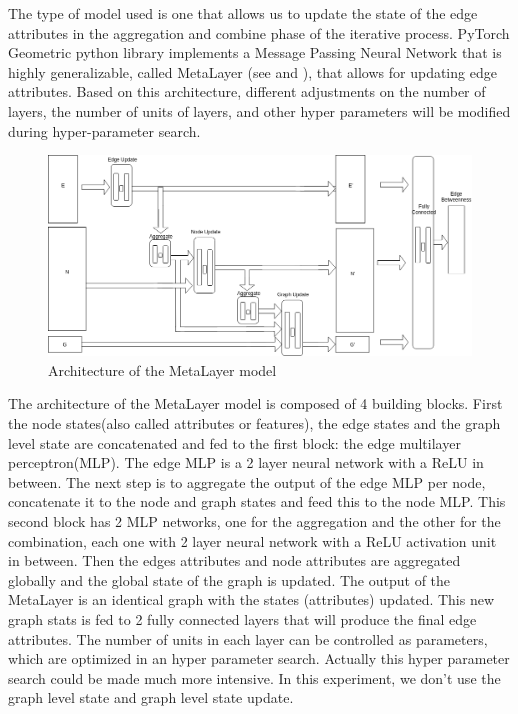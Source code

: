  The type of model used is one that allows us to update the state of the edge attributes in the aggregation and combine phase of the iterative process. PyTorch Geometric python library implements a Message Passing Neural Network \cite{mpnn} that is highly generalizable, called MetaLayer (see \cite{battaglia2018relational} and \cite{fey2019fast} ), that allows for updating edge attributes. Based on this architecture, different adjustments on the number of layers, the number of units of layers, and other hyper parameters will be modified during hyper-parameter search. 



\begin{figure}[H]
    \centering
        \includegraphics[width=0.85\linewidth]{img/GN_exp1_metalayer2.png}
    \caption{Architecture of the MetaLayer model}\label{fig:metalayer_diagram}
\end{figure}

 The architecture of the MetaLayer model is composed of 4 building blocks. First the node states(also called attributes or features), the edge states and the graph level state are concatenated and fed to the first block: the edge multilayer perceptron(MLP). The edge MLP is a 2 layer neural network with a ReLU in between. The next step is to aggregate the output of the edge MLP per node, concatenate it to the node and graph states and feed this to the node MLP. This second block has 2 MLP networks, one for the aggregation and the other for the combination, each one with 2 layer neural network with a ReLU activation unit in between. Then the edges attributes and node attributes are aggregated globally and the global state of the graph is updated. The output of the MetaLayer is an identical graph with the states (attributes) updated. This new graph stats is fed to 2 fully connected layers that will produce the final edge attributes. The number of units in each layer can be controlled as parameters, which are optimized in an hyper parameter search. Actually this hyper parameter search could be made much more intensive. In this experiment, we don't use the graph level state and graph level state update.

